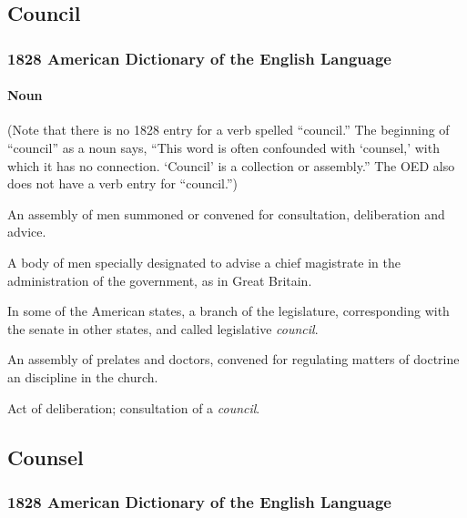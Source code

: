 	\subsection{Council} %
		\label{COUNCIL}
		
		\subsubsection{1828 American Dictionary of the English Language}
		
			\paragraph{Noun}
			
				(Note that there is no 1828 entry for a verb spelled ``council.'' The beginning of ``council'' as a noun says, ``This word is often confounded with `counsel,' with which it has no connection. `Council' is a collection or assembly.'' The OED also does not have a verb entry for ``council.'')
				
				\begin{compactitem}
					\item An assembly of men summoned or convened for consultation, deliberation and advice.
					\item A body of men specially designated to advise a chief magistrate in the administration of the government, as in Great Britain.
					\item In some of the American states, a branch of the legislature, corresponding with the senate in other states, and called legislative \textit{council}.
					\item An assembly of prelates and doctors, convened for regulating matters of doctrine an discipline in the church.
					\item Act of deliberation; consultation of a \textit{council}.
				\end{compactitem}
			
	\subsection{Counsel} %
		\label{COUNSEL}
		
		\subsubsection{1828 American Dictionary of the English Language}
		
